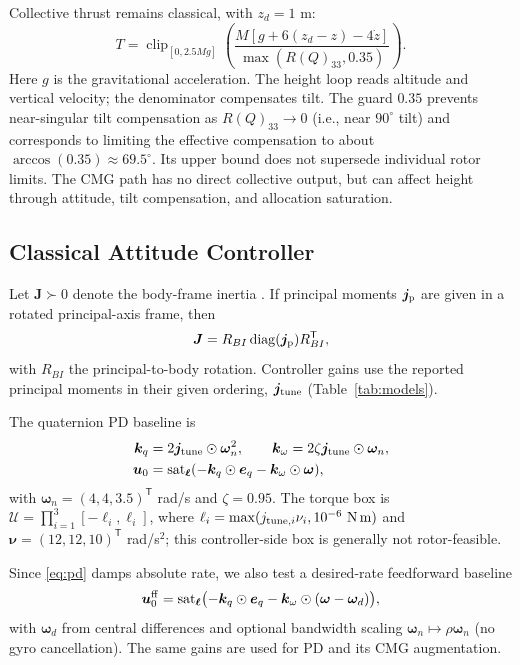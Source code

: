 \documentclass[letterpaper, 10 pt, conference]{ieeeconf}
\newcommand{\T}{^{\mathsf T}}
\newcommand{\sat}{\operatorname{sat}}
\newcommand{\clip}{\operatorname{clip}}
\begin{document}
Collective thrust remains classical, with $z_d=1$ m:
\begin{equation}
 T=\clip_{[0,2.5Mg]}
 \left(\frac{M[g+6(z_d-z)-4\dot z]}{\max(R(Q)_{33},0.35)}\right).
 \label{eq:collective}
\end{equation}
Here $g$ is the gravitational acceleration. The height loop reads altitude and vertical velocity; the denominator compensates tilt.
The guard $0.35$ prevents near-singular tilt compensation as $R(Q)_{33}\to0$
(i.e., near $90^\circ$ tilt) and corresponds to limiting the effective
compensation to about $\arccos(0.35)\approx69.5^\circ$. Its upper bound does
not supersede individual rotor limits. The CMG path has no direct collective
output, but can affect height through attitude, tilt compensation, and
allocation saturation.

\subsection{Classical Attitude Controller}
Let $\bm J\succ0$ denote the body-frame inertia \cite{schaub2018amss}. If principal moments $\bm j_{\rm p}$ are given in a rotated principal-axis frame, then
\begin{equation}
 \bm J=R_{BI}\operatorname{diag}(\bm j_{\rm p})R_{BI}\T,
 \label{eq:inertiaframe}
\end{equation}
with $R_{BI}$ the principal-to-body rotation. Controller gains use the reported principal moments in their given ordering, $\bm j_{\rm tune}$ (Table~\ref{tab:models}).

The quaternion PD baseline is
\begin{align}
 \bm k_q&=2\bm j_{\rm tune}\odot\bm\omega_n^2,\qquad
 \bm k_\omega=2\zeta\bm j_{\rm tune}\odot\bm\omega_n,\\
 \bm u_0&=\sat_{\bm\ell}(-\bm k_q\odot\bm e_q-\bm k_\omega\odot\bm\omega),
 \label{eq:pd}
\end{align}
with $\bm\omega_n=(4,4,3.5)\T$ rad/s and $\zeta=0.95$. The torque box is
$\mathcal U=\prod_{i=1}^3[-\ell_i,\ell_i]$, where
$\ell_i=\max(j_{{\rm tune},i}\nu_i,10^{-6}\ \mathrm{N\,m})$ and
$\bm\nu=(12,12,10)\T$ rad/s$^2$; this controller-side box is generally not rotor-feasible.

Since \eqref{eq:pd} damps absolute rate, we also test a desired-rate feedforward baseline
\begin{equation}
 \bm u_0^{\rm ff}=\sat_{\bm\ell}\bigl(-\bm k_q\odot\bm e_q-\bm k_\omega\odot(\bm\omega-\bm\omega_d)\bigr),
 \label{eq:pdff}
\end{equation}
with $\bm\omega_d$ from central differences and optional bandwidth scaling $\bm\omega_n\mapsto\rho\bm\omega_n$ (no gyro cancellation). The same gains are used for PD and its CMG augmentation.
\end{document}
